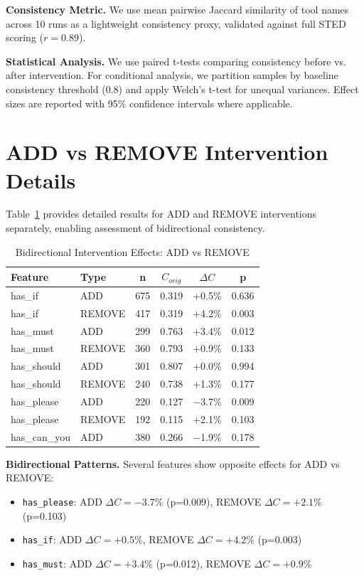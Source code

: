 \documentclass[sigconf,anonymous,review]{acmart}
\begin{document}
\textbf{Consistency Metric.} We use mean pairwise Jaccard similarity of tool names across 10 runs as a lightweight consistency proxy, validated against full STED scoring ($r = 0.89$).

\textbf{Statistical Analysis.} We use paired t-tests comparing consistency before vs. after intervention. For conditional analysis, we partition samples by baseline consistency threshold (0.8) and apply Welch's t-test for unequal variances. Effect sizes are reported with 95\% confidence intervals where applicable.

\section{ADD vs REMOVE Intervention Details}
\label{app:add_remove}

Table~\ref{tab:add_remove} provides detailed results for ADD and REMOVE interventions separately, enabling assessment of bidirectional consistency.

\begin{table}[h]
\centering
\caption{Bidirectional Intervention Effects: ADD vs REMOVE}
\label{tab:add_remove}
\small
\begin{tabular}{@{}llcccc@{}}
\toprule
\textbf{Feature} & \textbf{Type} & \textbf{n} & \textbf{$C_{orig}$} & \textbf{$\Delta C$} & \textbf{p} \\
\midrule
has\_if & ADD & 675 & 0.319 & +0.5\% & 0.636 \\
has\_if & REMOVE & 417 & 0.319 & +4.2\% & 0.003 \\
\midrule
has\_must & ADD & 299 & 0.763 & +3.4\% & 0.012 \\
has\_must & REMOVE & 360 & 0.793 & +0.9\% & 0.133 \\
\midrule
has\_should & ADD & 301 & 0.807 & +0.0\% & 0.994 \\
has\_should & REMOVE & 240 & 0.738 & +1.3\% & 0.177 \\
\midrule
has\_please & ADD & 220 & 0.127 & $-$3.7\% & 0.009 \\
has\_please & REMOVE & 192 & 0.115 & +2.1\% & 0.103 \\
\midrule
has\_can\_you & ADD & 380 & 0.266 & $-$1.9\% & 0.178 \\
\bottomrule
\end{tabular}
\end{table}

\textbf{Bidirectional Patterns.} Several features show opposite effects for ADD vs REMOVE:
\begin{itemize}
    \item \texttt{has\_please}: ADD $\Delta C = -3.7\%$ (p=0.009), REMOVE $\Delta C = +2.1\%$ (p=0.103)
    \item \texttt{has\_if}: ADD $\Delta C = +0.5\%$, REMOVE $\Delta C = +4.2\%$ (p=0.003)
    \item \texttt{has\_must}: ADD $\Delta C = +3.4\%$ (p=0.012), REMOVE $\Delta C = +0.9\%$
\end{itemize}
\end{document}
